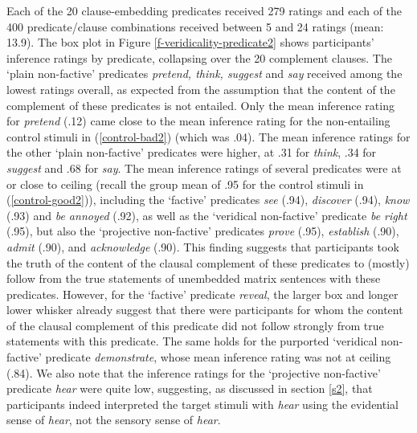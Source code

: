 \documentclass[11pt,fleqn]{article}
\newcommand{\6}{\mbox{$[\hspace*{-.6mm}[$}}
\newcommand{\9}{\mbox{$]\hspace*{-.6mm}]$}}
\begin{document}
Each of the 20 clause-embedding predicates received 279 ratings and each of the 400 predicate/clause combinations received between 5 and 24 ratings (mean: 13.9). The box plot in Figure \ref{f-veridicality-predicate2} shows participants' inference ratings by predicate, collapsing over the 20 complement clauses. The `plain non-factive' predicates {\em pretend, think, suggest} and {\em say} received among the lowest ratings overall, as expected from the assumption that the content of the complement of these predicates is not entailed. Only the mean inference rating for {\em pretend} (.12) came close to the mean inference rating for the non-entailing control stimuli in (\ref{control-bad2}) (which was .04). The mean inference ratings for the other `plain non-factive' predicates were higher, at .31 for {\em think}, .34 for {\em suggest} and .68 for {\em say}. The mean inference ratings of several predicates were at or close to ceiling (recall the group mean of .95 for the control stimuli in (\ref{control-good2})), including the `factive' predicates {\em see} (.94), {\em discover} (.94),  {\em know} (.93) and {\em be annoyed} (.92), as well as the `veridical non-factive' predicate {\em be right} (.95), but also the `projective non-factive' predicates {\em prove} (.95),  {\em establish} (.90), {\em admit} (.90), and {\em acknowledge} (.90). This finding suggests that participants took the truth of the content of the clausal complement of these predicates to (mostly) follow from the true statements of unembedded matrix sentences with these predicates. However, for the `factive' predicate {\em reveal}, the larger box and longer lower whisker already suggest that there were participants for whom the content of the clausal complement of this predicate did not follow strongly from true statements with this predicate. The same holds for the purported `veridical non-factive' predicate {\em demonstrate}, whose mean inference rating was not at ceiling (.84). We also note that the inference ratings for the `projective non-factive' predicate {\em hear} were quite low, suggesting, as discussed in section \ref{s2}, that participants indeed interpreted the target stimuli with {\em hear} using the evidential sense of {\em hear}, not the sensory sense of {\em hear}. 

\end{document}
